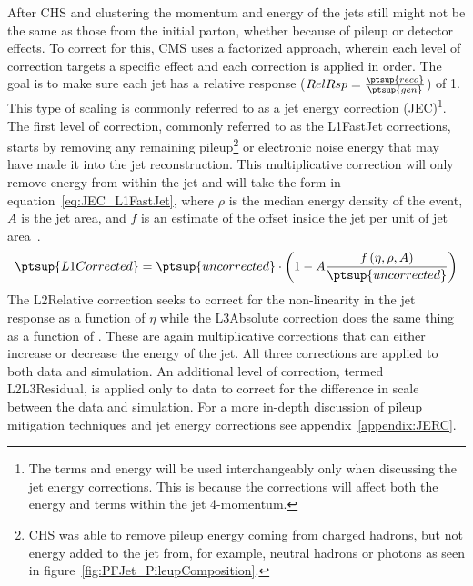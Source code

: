 After CHS and clustering the momentum and energy of the jets still might not be the same as those from the initial parton, whether because of pileup or detector effects.
To correct for this, CMS uses a factorized approach, wherein each level of correction targets a specific effect and each correction is applied in order.
The goal is to make sure each jet has a relative response ($RelRsp=\frac{\ptsup{reco}}{\ptsup{gen}}$) of 1.
This type of scaling is commonly referred to as a jet energy correction (JEC)\footnote{The terms \pt and energy will be used interchangeably only when discussing the jet energy corrections. This is because the corrections will affect both the energy and \pt terms within the jet 4-momentum.}.
The first level of correction, commonly referred to as the L1FastJet corrections, starts by removing any remaining pileup\footnote{CHS was able to remove pileup energy coming from charged hadrons, but not energy added to the jet from, for example, neutral hadrons or photons as seen in figure~\ref{fig:PFJet_PileupComposition}.} or electronic noise energy that may have made it into the jet reconstruction.
This multiplicative correction will only remove energy from within the jet and will take the form in equation~\ref{eq:JEC_L1FastJet}, where $\rho$ is the median energy density of the event, $A$ is the jet area, and $f$ is an estimate of the offset inside the jet per unit of jet area~\cite{JINST2011,Cacciari2007}.
\begin{equation}
\label{eq:JEC_L1FastJet}
\ptsup{L1Corrected}=\ptsup{uncorrected}\cdot\left(1-A\frac{f\left(\eta,\rho,A\right)}{\ptsup{uncorrected}}\right)
\end{equation}
The L2Relative correction seeks to correct for the non-linearity in the jet response as a function of $\eta$ while the L3Absolute correction does the same thing as a function of \pt.
These are again multiplicative corrections that can either increase or decrease the energy of the jet.
All three corrections are applied to both data and simulation.
An additional level of correction, termed L2L3Residual, is applied only to data to correct for the difference in scale between the data and simulation. For a more in-depth discussion of pileup mitigation techniques and jet energy corrections see appendix~\ref{appendix:JERC}.

